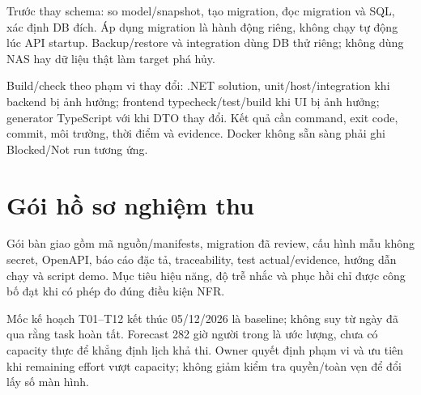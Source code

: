 Trước thay schema: so model/snapshot, tạo migration, đọc migration và SQL, xác định DB đích. Áp dụng migration là hành động riêng, không chạy tự động lúc API startup. Backup/restore và integration dùng DB thử riêng; không dùng NAS hay dữ liệu thật làm target phá hủy.

Build/check theo phạm vi thay đổi: .NET solution, unit/host/integration khi backend bị ảnh hưởng; frontend typecheck/test/build khi UI bị ảnh hưởng; generator TypeScript với  khi DTO thay đổi. Kết quả cần command, exit code, commit, môi trường, thời điểm và evidence. Docker không sẵn sàng phải ghi Blocked/Not run tương ứng.

\section{Gói hồ sơ nghiệm thu}
Gói bàn giao gồm mã nguồn/manifests, migration đã review, cấu hình mẫu không secret, OpenAPI, báo cáo đặc tả, traceability, test actual/evidence, hướng dẫn chạy và script demo. Mục tiêu hiệu năng, độ trễ nhắc và phục hồi chỉ được công bố đạt khi có phép đo đúng điều kiện NFR.

Mốc kế hoạch T01--T12 kết thúc 05/12/2026 là baseline; không suy từ ngày đã qua rằng task hoàn tất. Forecast 282 giờ người trong  là ước lượng, chưa có capacity thực để khẳng định lịch khả thi. Owner quyết định phạm vi và ưu tiên khi remaining effort vượt capacity; không giảm kiểm tra quyền/toàn vẹn để đổi lấy số màn hình.
